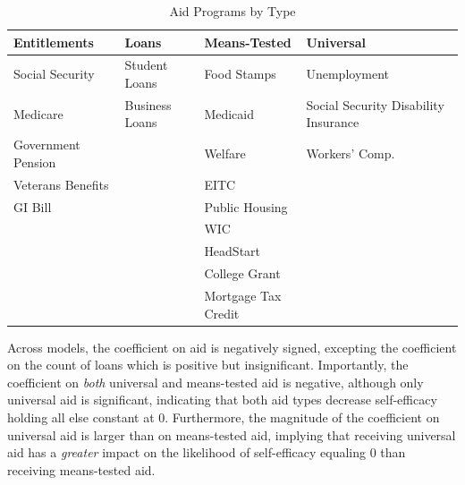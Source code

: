 \documentclass[12pt]{paper}
\begin{document}
\begin{table}[]
	\begin{adjustbox}{width=1\textwidth}
\begin{tabular}{llll}
	\hline
	\textbf{Entitlements} & \textbf{Loans} & \textbf{Means-Tested} & \textbf{Universal}                   \\ \hline
	Social Security       & Student Loans  & Food Stamps           & Unemployment                         \\
	Medicare              & Business Loans & Medicaid              & Social Security Disability Insurance \\
	Government Pension    &                & Welfare               & Workers' Comp.                       \\
	Veterans Benefits     &                & EITC                  &                                      \\
	GI Bill               &                & Public Housing        &                                      \\
	&                & WIC                   &                                      \\
	&                & HeadStart             &                                      \\
	&                & College Grant         &                                      \\
	&                & Mortgage Tax Credit   &                                      \\ \hline
\end{tabular}
\end{adjustbox}
\caption{Aid Programs by Type} 
\label{}
\end{table}


Across models, the coefficient on aid is negatively signed, excepting the coefficient on the count of loans which is positive but insignificant. Importantly, the coefficient on \textit{both} universal and means-tested aid is negative, although only universal aid is significant, indicating that both aid types decrease self-efficacy holding all else constant at 0. Furthermore, the magnitude of the coefficient on universal aid is larger than on means-tested aid, implying that receiving universal aid has a \textit{greater} impact on the likelihood of self-efficacy equaling 0 than receiving means-tested aid.
\end{document}

